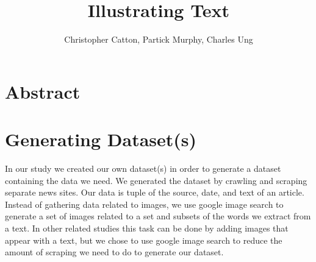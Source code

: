 \documentclass[12pt]{article}
\title{Illustrating Text}
\author{Christopher Catton, Partick Murphy, Charles Ung}
\begin{document}
\section{Abstract}
\section{Generating Dataset(s)}
In our study we created our own dataset(s) in order to generate a dataset containing the data we need. We generated the dataset by crawling and scraping separate news sites. Our data is tuple of the source, date, and text of an article.
Instead of gathering data related to images, we use google image search to generate a set of images related to a set and subsets of the words we extract from a text. In other related studies this task can be done by adding images that appear with a text, but we chose to use google image search to reduce the amount of scraping we need to do to generate our dataset.
\end{document}
